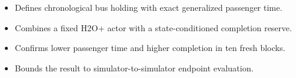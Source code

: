\begin{itemize}
\item Defines chronological bus holding with exact generalized passenger time.
\item Combines a fixed H2O+ actor with a state-conditioned completion reserve.
\item Confirms lower passenger time and higher completion in ten fresh blocks.
\item Bounds the result to simulator-to-simulator endpoint evaluation.
\end{itemize}
